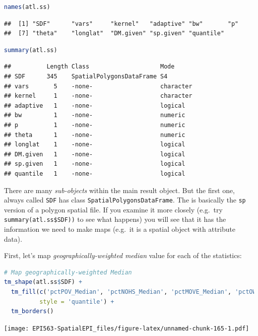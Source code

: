 \documentclass[
]{book}
\newcommand{\passthrough}[1]{#1}
\begin{document}
\begin{lstlisting}[language=R]
names(atl.ss)
\end{lstlisting}

\begin{lstlisting}
##  [1] "SDF"      "vars"     "kernel"   "adaptive" "bw"       "p"       
##  [7] "theta"    "longlat"  "DM.given" "sp.given" "quantile"
\end{lstlisting}

\begin{lstlisting}[language=R]
summary(atl.ss)
\end{lstlisting}

\begin{lstlisting}
##          Length Class                    Mode     
## SDF      345    SpatialPolygonsDataFrame S4       
## vars       5    -none-                   character
## kernel     1    -none-                   character
## adaptive   1    -none-                   logical  
## bw         1    -none-                   numeric  
## p          1    -none-                   numeric  
## theta      1    -none-                   numeric  
## longlat    1    -none-                   logical  
## DM.given   1    -none-                   logical  
## sp.given   1    -none-                   logical  
## quantile   1    -none-                   logical
\end{lstlisting}

There are many \emph{sub-objects} within the main result object. But the first one, always called \passthrough{\lstinline!SDF!} has class \passthrough{\lstinline!SpatialPolygonsDataFrame!}. The is basically the \passthrough{\lstinline!sp!} version of a polygon spatial file. If you examine it more closely (e.g.~try \passthrough{\lstinline!summary(atl.ss$SDF))!} to see what happens) you will see that it has the information we need to make maps (e.g.~it is a spatial object with attribute data).

First, let's map \emph{geographically-weighted median} value for each of the statistics:

\begin{lstlisting}[language=R]
# Map geographically-weighted Median
tm_shape(atl.ss$SDF) + 
  tm_fill(c('pctPOV_Median', 'pctNOHS_Median', 'pctMOVE_Median', 'pctOWNER_OCC_Median'),
          style = 'quantile') +
  tm_borders()
\end{lstlisting}

\texttt{[image: EPI563-SpatialEPI\_files/figure-latex/unnamed-chunk-165-1.pdf]}
\end{document}
